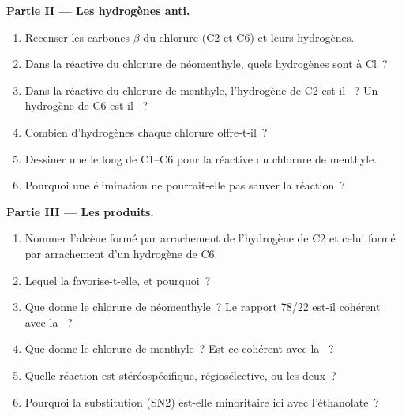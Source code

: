 \begin{problem}
\medskip
\noindent\textbf{Partie II --- Les hydrogènes anti.}
\begin{enumerate}[resume]
  \item Recenser les carbones $\beta$ du chlorure (C2 et C6) et leurs
        hydrogènes.
  \item Dans la  réactive du chlorure de néomenthyle, quels
        hydrogènes sont  à Cl~?
  \item Dans la  réactive du chlorure de menthyle, l'hydrogène de
        C2 est-il ~? Un hydrogène de C6 est-il ~?
  \item Combien d'hydrogènes  chaque chlorure
        offre-t-il~?
  \item Dessiner une  le long de C1--C6 pour la
         réactive du chlorure de menthyle.
  \item Pourquoi une élimination  ne pourrait-elle pas
        sauver la réaction~?
\end{enumerate}

\medskip
\noindent\textbf{Partie III --- Les produits.}
\begin{enumerate}[resume]
  \item Nommer l'alcène formé par arrachement de l'hydrogène de C2 et
        celui formé par arrachement d'un hydrogène de C6.
  \item Lequel la  favorise-t-elle, et pourquoi~?
  \item Que donne le chlorure de néomenthyle~? Le rapport 78/22
        est-il cohérent avec la ~?
  \item Que donne le chlorure de menthyle~? Est-ce cohérent avec la
        ~?
  \item Quelle réaction est stéréospécifique, régiosélective, ou les
        deux~?
  \item Pourquoi la substitution (SN2) est-elle minoritaire ici avec
        l'éthanolate~?
\end{enumerate}


\end{problem}
